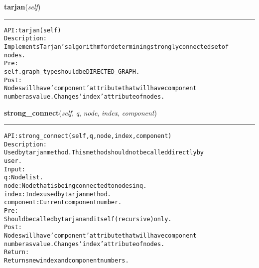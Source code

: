     \label{coinor:gimpy:graph:Graph:tarjan}

    \vspace{0.5ex}

\hspace{.8\funcindent}\begin{boxedminipage}{\funcwidth}

    \raggedright \textbf{tarjan}(\textit{self})

    \vspace{-1.5ex}

    \rule{\textwidth}{0.5\fboxrule}
\setlength{\parskip}{2ex}
\begin{alltt}

API: tarjan(self)
Description:
Implements Tarjan's algorithm for determining strongly connected set of
nodes.
Pre:
    self.graph\_type should be DIRECTED\_GRAPH.
Post:
    Nodes will have 'component' attribute that will have component
    number as value. Changes 'index' attribute of nodes.
\end{alltt}

\setlength{\parskip}{1ex}
    \end{boxedminipage}

    \label{coinor:gimpy:graph:Graph:strong_connect}

    \vspace{0.5ex}

\hspace{.8\funcindent}\begin{boxedminipage}{\funcwidth}

    \raggedright \textbf{strong\_connect}(\textit{self}, \textit{q}, \textit{node}, \textit{index}, \textit{component})

    \vspace{-1.5ex}

    \rule{\textwidth}{0.5\fboxrule}
\setlength{\parskip}{2ex}
\begin{alltt}

API: strong\_connect (self, q, node, index, component)
Description:
Used by tarjan method. This method should not be called directly by
user.
Input:
    q: Node list.
    node: Node that is being connected to nodes in q.
    index: Index used by tarjan method.
    component: Current component number.
Pre:
    Should be called by tarjan and itself (recursive) only.
Post:
    Nodes will have 'component' attribute that will have component
    number as value. Changes 'index' attribute of nodes.
Return:
    Returns new index and component numbers.
\end{alltt}

\setlength{\parskip}{1ex}
    \end{boxedminipage}

